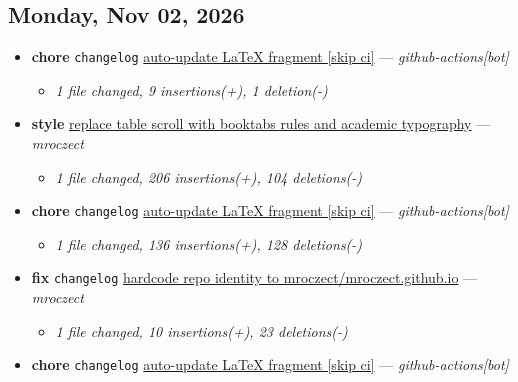 \subsection*{Monday, Nov 02, 2026}

\begin{itemize}[leftmargin=1.5em]
  \item \textbf{chore} \texttt{changelog} \href{https://github.com/mroczect/mroczect.github.io/commit/0e280edbf2ed0cd306d27025b184938bed27196c}{auto-update LaTeX fragment [skip ci]} --- \textit{github-actions[bot]}
  \begin{itemize}[leftmargin=1.5em]
    \item \small\textit{1 file changed, 9 insertions(+), 1 deletion(-)}
  \end{itemize}
  \item \textbf{style} \href{https://github.com/mroczect/mroczect.github.io/commit/85b47afaea677dd49f09b9ab4f8892aebce4ba2e}{replace table scroll with booktabs rules and academic typography} --- \textit{mroczect}
  \begin{itemize}[leftmargin=1.5em]
    \item \small\textit{1 file changed, 206 insertions(+), 104 deletions(-)}
  \end{itemize}
  \item \textbf{chore} \texttt{changelog} \href{https://github.com/mroczect/mroczect.github.io/commit/8e0e84b71f02c805c14d5520b3b75753e214d4fd}{auto-update LaTeX fragment [skip ci]} --- \textit{github-actions[bot]}
  \begin{itemize}[leftmargin=1.5em]
    \item \small\textit{1 file changed, 136 insertions(+), 128 deletions(-)}
  \end{itemize}
  \item \textbf{fix} \texttt{changelog} \href{https://github.com/mroczect/mroczect.github.io/commit/b8302fe2bdb0192cc5c007c76897f751904e2e9e}{hardcode repo identity to mroczect/mroczect.github.io} --- \textit{mroczect}
  \begin{itemize}[leftmargin=1.5em]
    \item \small\textit{1 file changed, 10 insertions(+), 23 deletions(-)}
  \end{itemize}
  \item \textbf{chore} \texttt{changelog} \href{https://github.com/mroczect/mroczect.github.io/commit/169fb708f213ff4ae43269b7fdbc57f623aaa316}{auto-update LaTeX fragment [skip ci]} --- \textit{github-actions[bot]}
  \begin{itemize}[leftmargin=1.5em]

\end{itemize}
\end{itemize}
